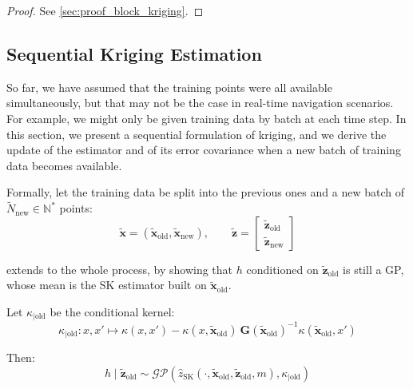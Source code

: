 \begin{proof}
	See \cref{sec:proof_block_kriging}.
\end{proof}

\subsection{Sequential Kriging Estimation}

So far, we have assumed that the training points were all available simultaneously, but that may not be the case in real-time navigation scenarios. For example, we might only be given training data by batch at each time step. In this section, we present a sequential formulation of kriging, and we derive the update of the estimator and of its error covariance when a new batch of training data becomes available.

Formally, let the training data be split into the previous ones and a new batch of $\tilde{N}_{\mathrm{new}}\in\mathbb{N}^*$ points:
\begin{equation}
	\tilde{\mathbf{x}}=\left(\tilde{\mathbf{x}}_{\mathrm{old}},\tilde{\mathbf{x}}_{\mathrm{new}}\right),\qquad\tilde{\mathbf{z}}=\begin{bmatrix}\tilde{\mathbf{z}}_{\mathrm{old}}\\\tilde{\mathbf{z}}_{\mathrm{new}}\end{bmatrix}
\end{equation}

 extends  to the whole process, by showing that $h$ conditioned on $\tilde{\mathbf{z}}_{\mathrm{old}}$ is still a GP, whose mean is the SK estimator built on $\tilde{\mathbf{x}}_{\mathrm{old}}$.

\begin{proposition}\label{th:conditional_GP}
	Let $\kappa_{|\mathrm{old}}$ be the conditional kernel:
	\begin{equation}
		\kappa_{|\mathrm{old}}:x,x'\mapsto \kappa(x,x')-\kappa(x,\tilde{\mathbf{x}}_{\mathrm{old}})\:\mathbf{G}(\tilde{\mathbf{x}}_{\mathrm{old}})^{-1}\kappa(\tilde{\mathbf{x}}_{\mathrm{old}},x')\label{eq:conditional_kernel}
	\end{equation}

	Then:
	\begin{equation}
		h\mid\tilde{\mathbf{z}}_{\mathrm{old}}\sim\mathcal{GP}\left(\hat{z}_{\mathrm{SK}}(\cdot,\tilde{\mathbf{x}}_{\mathrm{old}},\tilde{\mathbf{z}}_{\mathrm{old}},m),\kappa_{|\mathrm{old}}\right)
	\end{equation}
\end{proposition}

